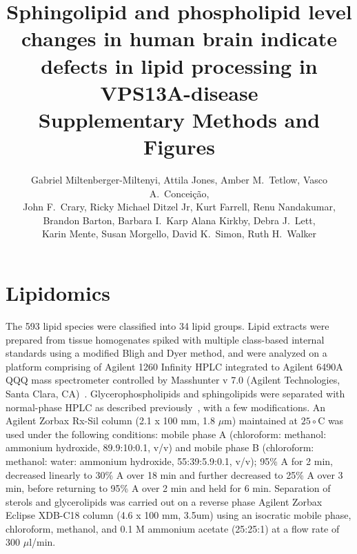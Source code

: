 \documentclass[letterpaper]{article}
\begin{document}
\title{Sphingolipid and phospholipid level changes in human brain indicate
defects in lipid processing in VPS13A-disease
	\\
{\large Supplementary Methods and Figures}}

\author{Gabriel Miltenberger-Miltenyi, Attila Jones, Amber M.~Tetlow,  Vasco A.~Conceição, 
\\
	John F.~Crary, Ricky Michael Ditzel Jr, Kurt Farrell, Renu Nandakumar,
\\
	Brandon Barton, Barbara I.~Karp  Alana Kirkby, Debra J.~Lett,
\\
	Karin Mente, Susan Morgello, David K.~Simon, Ruth H.~Walker}
\date{}
\maketitle

\renewcommand{\contentsname}{Supplementary Methods}
\tableofcontents
\renewcommand*\listfigurename{Supplementary Figures}
\listoffigures

\setcounter{table}{4}
\makeatletter 
\renewcommand{\tablename}{Supplementary Table S} %
\makeatother

\section{Lipidomics}

The 593 lipid species were classified into 34 lipid groups. 
Lipid extracts were prepared from tissue homogenates spiked with multiple
class-based internal standards using a modified Bligh and Dyer method, and
were analyzed on a platform comprising of Agilent 1260 Infinity HPLC
integrated to Agilent 6490A QQQ mass spectrometer controlled by Masshunter v
7.0 (Agilent Technologies, Santa Clara, CA)~\citep{Chan2017}. Glycerophospholipids and
sphingolipids were separated with normal-phase HPLC as described
previously~\citep{CHAN20122678},
with a few modifications. An Agilent Zorbax Rx-Sil column (2.1 x 100 mm, 1.8
$\mu$m) maintained at $25\circ$C was used under the following conditions: mobile phase A
(chloroform: methanol: ammonium hydroxide, 89.9:10:0.1, v/v) and mobile phase
B (chloroform: methanol: water: ammonium hydroxide, 55:39:5.9:0.1, v/v); 95\% A
for 2 min, decreased linearly to 30\% A over 18 min and further decreased to
25\% A over 3 min, before returning to 95\% A over 2 min and held for 6 min.
Separation of sterols and glycerolipids was carried out on a reverse phase
Agilent Zorbax Eclipse XDB-C18 column (4.6 x 100 mm, 3.5um) using an isocratic
mobile phase, chloroform, methanol, and 0.1 M ammonium acetate (25:25:1) at a
flow rate of 300 $\mu$l/min.
\end{document}
